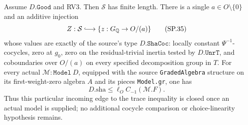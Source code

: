 \begin{proposition}
\label{claim:SP7}
Assume $D.\texttt{Good}$ and RV3.  Then $\mathcal S$ has finite
length.  There is a single $a\in O\setminus\{0\}$ and an additive
injection
\[
          Z:\mathcal S\lhook\joinrel\longrightarrow
                  \{z:G_{\mathbb Q}\to O/(a)\}
 \tag{SP.35}
\]
whose values are exactly of the source's type $D.\texttt{ShaCoc}$:
locally constant $\Psi^{-1}$-cocycles, zero at $g_0$, zero on the
residual-trivial inertia tested by $D.\texttt{UnrT}$, and
coboundaries over $O/(a)$ on every specified decomposition group
in $T$.
For every actual $\mathcal M:\texttt{Model}\ D$, equipped with the
source \texttt{GradedAlgebra} structure on its first-weight-zero
algebra $A$ and its pieces \texttt{Model.gr}, one has
\[
       D.\mathrm{sha}\le
       \ell_OC_{-1}(\mathcal M.F).
 \tag{SP.36}
\]
Thus this particular incoming edge to the trace inequality is closed
once an actual model is supplied; no additional cocycle comparison
or choice-linearity hypothesis remains.
\end{proposition}


